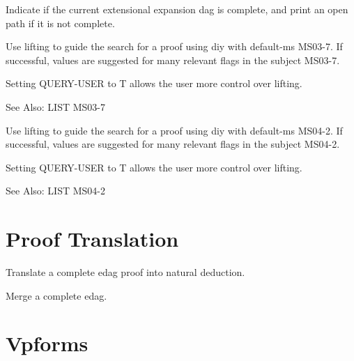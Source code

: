 \begin{description} 
\item[COMPLETE-P]  
Indicate if the current extensional expansion dag is complete,
and print an open path if it is not complete.

\item[MS03-LIFT]  
Use lifting to guide the search for a proof using diy
with default-ms MS03-7.  If successful, values are suggested for many
relevant flags in the subject MS03-7.

Setting QUERY-USER to T allows the user more control over lifting.

See Also: LIST MS03-7

\item[MS04-LIFT]  
Use lifting to guide the search for a proof using diy
with default-ms MS04-2.  If successful, values are suggested for many
relevant flags in the subject MS04-2.

Setting QUERY-USER to T allows the user more control over lifting.

See Also: LIST MS04-2
\item
\end{description}

\section{Proof Translation}

\begin{description} 
\item[ETREE-NAT]  
Translate a complete edag proof into natural deduction.

\item[MERGE-TREE]  
Merge a complete edag.
\item
\end{description}

\section{Vpforms}

